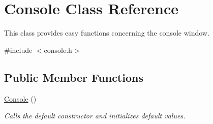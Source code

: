 \hypertarget{class_console}{}\section{Console Class Reference}
\label{class_console}


This class provides easy functions concerning the console window.  




{\ttfamily \#include $<$console.\+h$>$}

\subsection*{Public Member Functions}
\begin{DoxyCompactItemize}
\item 
\mbox{\label{class_console_aba16cfd9f0894eb1312b1bc1155b6646}} 
\mbox{\hyperlink{class_console_aba16cfd9f0894eb1312b1bc1155b6646}{Console}} ()
\begin{DoxyCompactList}\small\item\em Calls the default constructor and initializes default values. \end{DoxyCompactList}\end{DoxyCompactItemize}
